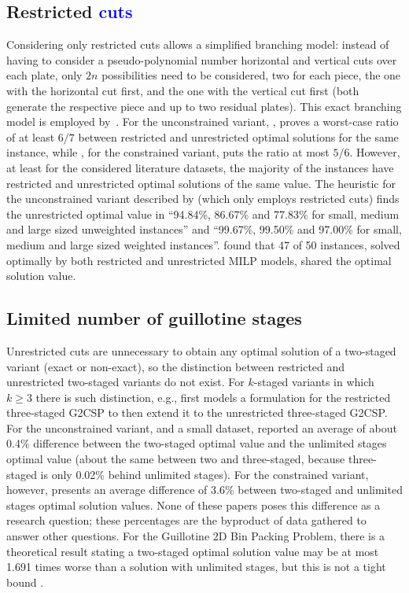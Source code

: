 \documentclass[ppgc,tese,english,formais,babel]{iiufrgs}
\newif\iffinalversion
\newcommand{\newtext}[1]{\iffinalversion%
#1%
\else%
\textcolor{blue}{#1}%
\fi%
}
\begin{document}
\subsection{Restricted \newtext{cuts}}

Considering only restricted cuts allows a simplified branching model: instead of having to consider a pseudo-polynomial number horizontal and vertical cuts over each plate, only \(2n\) possibilities need to be considered, two for each piece, the one with the horizontal cut first, and the one with the vertical cut first (both generate the respective piece and up to two residual plates).
This exact branching model is employed by~\citet{silva:2010}.
For the unconstrained variant, \citet{song:2010}, proves a worst-case ratio of at least \(6/7\) between restricted and unrestricted optimal solutions for the same instance, while \citet{furini:2016}, for the constrained variant, puts the ratio  at most \(5/6\).
However, at least for the considered literature datasets, the majority of the instances have restricted and unrestricted optimal solutions of the same value.
The heuristic for the unconstrained variant described by \citet{song:2010} (which only employs restricted cuts) finds the unrestricted optimal value in ``94.84\%, 86.67\% and 77.83\% for small, medium and large sized unweighted instances'' and ``99.67\%, 99.50\% and 97.00\% for small, medium and large sized weighted instances''.
\citet{furini:2016} found that 47 of 50 instances, solved optimally by both restricted and unrestricted MILP models, shared the optimal solution value.

\subsection{Limited number of guillotine stages}

Unrestricted cuts are unnecessary to obtain any optimal solution of a two-staged variant (exact or non-exact), so the distinction between restricted and unrestricted two-staged variants do not exist.
For \(k\)-staged variants in which~\(k \geq 3\) there is such distinction, e.g., \citet{puchinger:2007} first models a formulation for the restricted three-staged G2CSP to then extend it to the unrestricted three-staged G2CSP.
For the unconstrained variant, and a small dataset, \citet{beasley:1985:guillotine} reported an average of about 0.4\% difference between the two-staged optimal value and the unlimited stages optimal value (about the same between two and three-staged, because three-staged is only 0.02\% behind unlimited stages).
For the constrained variant, however, \citet{martin:2020:models} presents an average difference of 3.6\% between two-staged and unlimited stages optimal solution values.
None of these papers poses this difference as a research question; these percentages are the byproduct of data gathered to answer other questions.
For the Guillotine 2D Bin Packing Problem, there is a theoretical result stating a two-staged optimal solution value may be at most 1.691 times worse than a solution with unlimited stages, but this is not a tight bound \citep{bansal:2005}.
\end{document}
